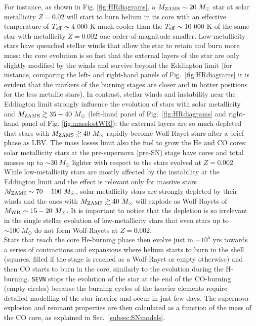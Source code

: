 \documentclass[a4paper,titlepage]{book}     	%
\newcommand{\sun}{\ensuremath{_\odot}}
\newcommand{\mzams}{M_\textup{ZAMS}}
\newcommand{\msun}{\ensuremath{M\sun}}
\begin{document}
For instance, as shown in Fig. \ref{fig:HRdiagrams}, a $\mzams \sim 20~\msun$ star at solar metallicity $Z=0.02$ will start to burn helium in its core with an effective temperature of $T_{\rm eff} \sim 4~000$ K much cooler than the $T_{\rm eff} \sim 10~000$ K of the same star with metallicity $Z=0.002$ one order-of-magnitude smaller. Low-metallicity stars have quenched stellar winds that allow the star to retain and burn more mass: the core evolution is so fast that the external layers of the star are only slightly modified by the winds and survive beyond the Eddington limit (for instance, comparing the left- and right-hand panels of Fig.\ \ref{fig:HRdiagrams} it is evident that the markers of the burning stages are closer and in hotter positions for the less metallic stars). In contrast, stellar winds and instability near the Eddington limit strongly influence the evolution of stars with solar metallicity and $\mzams \gtrsim 35-40~\msun$ (left-hand panel of Fig.\ \ref{fig:HRdiagrams} and right-hand panel of Fig. \ref{fig:masslostWR}): the external layers are so much depleted that stars with $\mzams \gtrsim 40~\msun$ rapidly become Wolf-Rayet stars after a brief phase as LBV. The mass losses limit also the fuel to grow the He and CO cores: solar metallicity stars at the pre-supernova (pre-SN) stage have cores and total masses up to $\sim 30~\msun$ lighter with respect to the stars evolved at $Z=0.002$. While low-metallicity stars are mostly affected by the instability at the Eddington limit and the effect is relevant only for massive stars $\mzams \sim 70-100~\msun$, solar-metallicity stars are strongly depleted by their winds and the ones with $\mzams \gtrsim 40~\msun$ will explode as Wolf-Rayets of $M_{\rm WR} \sim 15-20~\msun$. It is important to notice that the depletion is so irrelevant in the single stellar evolution of low-metallicity stars that even stars up to $\sim 100~\msun$ do not form Wolf-Rayets at $Z=0.002$.\\

Stars that reach the core He-burning phase then evolve just in $\sim 10^{5}$ yrs towards a series of contractions and expansions where helium starts to burn in the shell (squares, filled if the stage is reached as a Wolf-Rayet or empty otherwise) and then CO starts to burn in the core, similarly to the evolution during the H-burning. \texttt{SEVN} stops the evolution of the star at the end of the CO-burning (empty circles) because the burning cycles of the heavier elements require detailed modelling of the star interior and occur in just few days. The supernova explosion and remnant properties are then calculated as a function of the mass of the CO core, as explained in Sec.\ \ref{subsec:SNmodels}.
\end{document}
